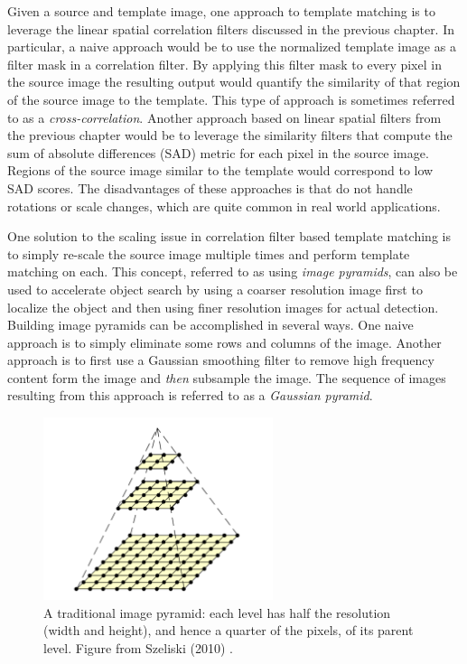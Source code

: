 Given a source and template image, one approach to template matching is to leverage the linear spatial correlation filters discussed in the previous chapter. In particular, a naive approach would be to use the normalized template image as a filter mask in a correlation filter. By applying this filter mask to every pixel in the source image the resulting output would quantify the similarity of that region of the source image to the template. This type of approach is sometimes referred to as a \textit{cross-correlation}.
Another approach based on linear spatial filters from the previous chapter would be to leverage the similarity filters that compute the sum of absolute differences (SAD) metric for each pixel in the source image. Regions of the source image similar to the template would correspond to low SAD scores.
The disadvantages of these approaches is that do not handle rotations or scale changes, which are quite common in real world applications.

One solution to the scaling issue in correlation filter based template matching is to simply re-scale the source image multiple times and perform template matching on each. This concept, referred to as using \textit{image pyramids}\cite{Szeliski2010}, can also be used to accelerate object search by using a coarser resolution image first to localize the object and then using finer resolution images for actual detection. Building image pyramids can be accomplished in several ways. One naive approach is to simply eliminate some rows and columns of the image. Another approach is to first use a Gaussian smoothing filter to remove high frequency content form the image and \textit{then} subsample the image. The sequence of images resulting from this approach is referred to as a \textit{Gaussian pyramid}.

\begin{figure}[ht]
  \centering
  \includegraphics[width=0.6\textwidth]{tex/figs/ch11_figs/image_pyramid.png}
\caption{A traditional image pyramid: each level has half the resolution (width and height), and hence a quarter of the pixels, of its parent level. Figure from Szeliski (2010) \nocite{Szeliski2010}.}
\label{image-pyramid}
\end{figure}

